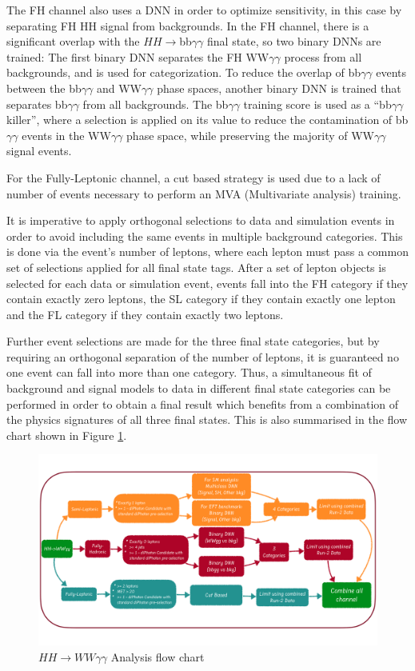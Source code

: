 The FH channel also uses a DNN in order to optimize sensitivity, in this case by separating FH HH signal from backgrounds. In the FH channel, there is a significant overlap with the $HH\rightarrow$bb$\gamma\gamma$ final state, so two binary DNNs are trained:
The first binary DNN separates the FH WW$\gamma\gamma$ process from all backgrounds, and is used for categorization. To reduce the overlap of bb$\gamma\gamma$ events between the bb$\gamma\gamma$ and WW$\gamma\gamma$ phase spaces,
another binary DNN is trained that separates bb$\gamma\gamma$ from all backgrounds. The bb$\gamma\gamma$ training score is used as a ``bb$\gamma\gamma$ killer'', where a selection is applied on its value
to reduce the contamination of bb$\gamma\gamma$ events in the WW$\gamma\gamma$ phase space, while preserving the majority of WW$\gamma\gamma$ signal events. 

For the Fully-Leptonic channel, a cut based strategy is used due to a lack of number of events necessary to perform an MVA (Multivariate analysis) training. 

It is imperative to apply orthogonal selections to data and simulation events in order to avoid including the same events in multiple background categories. This is done via the event's number of leptons, where
each lepton must pass a common set of selections applied for all final state tags. After a set of lepton objects is selected for each data or simulation event, events fall into the FH category if they contain exactly zero leptons, the SL category if they contain exactly one lepton and the FL category if they contain exactly two leptons.

Further event selections are made for the three final state categories,
but by requiring an orthogonal separation of the number of leptons, it is guaranteed no one event can fall into more than one category. Thus, a simultaneous fit of background and signal models to data 
in different final state categories can be performed in order to obtain a final result which benefits from a combination of the physics signatures of all three final states. This is also summarised in the flow chart shown in Figure \ref{fig:HHflowChart}.

\begin{figure}[h!]
    \includegraphics[width=\textwidth,trim={0 3cm 0 3cm},clip=true]{Sections/HHWWgg/images/Strategy/HH_flowchart.pdf}
    \caption{$HH\rightarrow WW\gamma\gamma$ Analysis flow chart}
    \label{fig:HHflowChart}
\end{figure}

